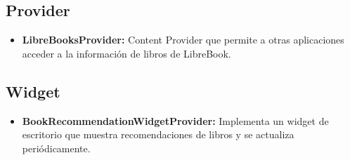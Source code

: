 \documentclass[a4paper,11pt]{report}
\begin{document}
      \subsection{Provider}
        \begin{itemize}
          \item \textbf{LibreBooksProvider:} Content Provider que permite a otras aplicaciones acceder a la información de libros de LibreBook.
        \end{itemize}
      \subsection{Widget}
        \begin{itemize}
          \item \textbf{BookRecommendationWidgetProvider:} Implementa un widget de escritorio que muestra recomendaciones de libros y se actualiza periódicamente.
        \end{itemize}
\end{document}

